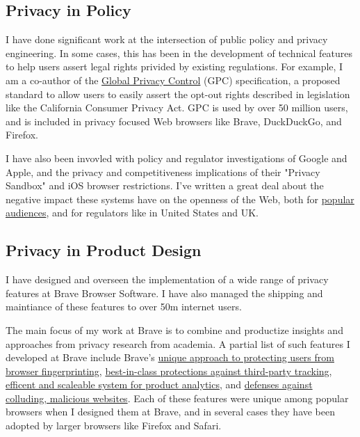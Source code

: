 \documentclass[wideaddress]{vitae}
\begin{document}
  \subsection{Privacy in Policy}
  \begin{description}
    \item{\noindent I have done significant work at the intersection of public
    policy and privacy engineering. In some cases, this has been in the development
    of technical features to help users assert legal rights privided by existing regulations.
    For example, I am a co-author of the \href{https://globalprivacycontrol.org/}{Global Privacy Control} (GPC)
    specification, a proposed standard to allow users to easily
    assert the opt-out rights described in legislation like the California Consumer Privacy Act.
    GPC is used by over 50 million users, and is included in privacy focused
    Web browsers like Brave, DuckDuckGo, and Firefox.}

    \item{\noindent I have also been invovled with policy and regulator
    investigations of Google and Apple, and the privacy and competitiveness
    implications of their "Privacy Sandbox" and iOS browser restrictions.
    I've written a great deal about the negative impact these
    systems have on the openness of the Web, both for \href{https://brave.com/web-standards-at-brave/}{popular audiences},
    and for regulators like in United States and UK.}
  \end{description}

  \subsection{Privacy in Product Design}
  \begin{description}
    \item{\noindent I have designed and overseen the implementation of a wide
    range of privacy features at Brave Browser Software. I have also managed
    the shipping and maintiance of these features to over 50m internet users.}

    \item{\noindent The main focus of my work at Brave is to combine and productize
    insights and approaches from privacy research from academia. A partial
    list of such features I developed at Brave include Brave's
    \href{https://brave.com/privacy-updates/3-fingerprint-randomization/}{unique approach to protecting users from browser fingerprinting},
    \href{https://brave.com/privacy-updates/7-ephemeral-storage/}{best-in-class protections against third-party tracking},
    \href{https://brave.com/privacy-updates/19-star/}{efficent and scaleable system for product analytics}, and
    \href{https://brave.com/privacy-updates/13-pool-party-side-channels/}{defenses against colluding, malicious websites}.
    Each of these features were unique among popular browsers when I designed
    them at Brave, and in several cases they have been adopted by larger
    browsers like Firefox and Safari.}
  \end{description}
\end{document}
